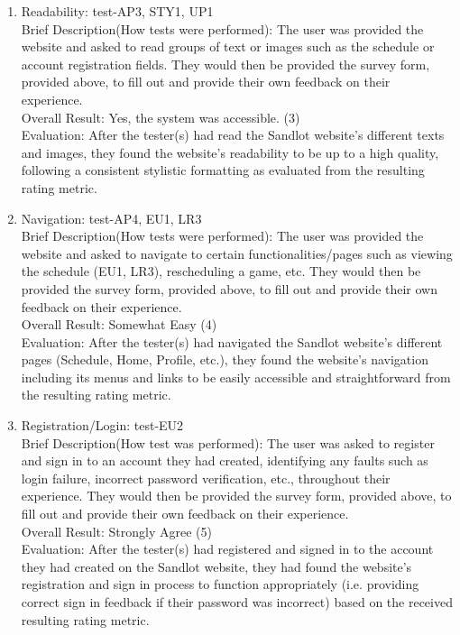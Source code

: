 \documentclass[12pt, titlepage]{article}
\begin{document}
\begin{enumerate}
  \item{Readability: test-AP3, STY1, UP1\\}
  Brief Description(How tests were performed): The user was provided the website and asked
  to read groups of text or images such as the schedule or account registration fields.
  They would then be provided the survey form, provided above, to fill out and provide their own feedback
  on their experience. \\
  Overall Result: Yes, the system was accessible. (3)\\
  Evaluation: After the tester(s) had read the Sandlot website's different texts and images,
  they found the website's readability to be up to a high quality, following a consistent
  stylistic formatting as evaluated from the resulting rating metric.
  \item{Navigation: test-AP4, EU1, LR3\\}
  Brief Description(How tests were performed): The user was provided the website and asked
  to navigate to certain functionalities/pages such as viewing the schedule (EU1, LR3),
  rescheduling a game, etc. They would then be provided the survey form, provided above, to fill
  out and provide their own feedback on their experience. \\
  Overall Result: Somewhat Easy (4)\\
  Evaluation: After the tester(s) had navigated the Sandlot website's different pages
  (Schedule, Home, Profile, etc.), they found the website's navigation including
  its menus and links to be easily accessible and straightforward from the resulting
  rating metric.
  \item{Registration/Login: test-EU2\\}
  Brief Description(How test was performed): The user was asked to register and sign in to
  an account they had created, identifying any faults such as login failure, incorrect
  password verification, etc., throughout their experience. They would then be provided the survey form, provided above, to fill
  out and provide their own feedback on their experience. \\
  Overall Result: Strongly Agree (5)\\
  Evaluation: After the tester(s) had registered and signed in to the account they had
  created on the Sandlot website, they had found the website's registration and sign in process
  to function appropriately (i.e. providing correct sign in feedback if their password was
  incorrect) based on the received resulting rating metric.
\end{enumerate}
		
\end{document}
